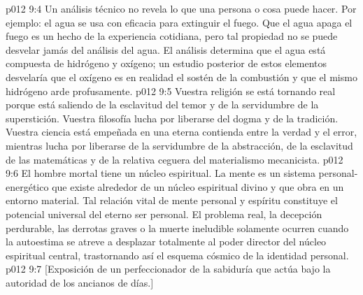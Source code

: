 \vs p012 9:4 Un análisis técnico no revela lo que una persona o cosa puede hacer. Por ejemplo: el agua se usa con eficacia para extinguir el fuego. Que el agua apaga el fuego es un hecho de la experiencia cotidiana, pero tal propiedad no se puede desvelar jamás del análisis del agua. El análisis determina que el agua está compuesta de hidrógeno y oxígeno; un estudio posterior de estos elementos desvelaría que el oxígeno es en realidad el sostén de la combustión y que el mismo hidrógeno arde profusamente.
\vs p012 9:5 Vuestra religión se está tornando real porque está saliendo de la esclavitud del temor y de la servidumbre de la superstición. Vuestra filosofía lucha por liberarse del dogma y de la tradición. Vuestra ciencia está empeñada en una eterna contienda entre la verdad y el error, mientras lucha por liberarse de la servidumbre de la abstracción, de la esclavitud de las matemáticas y de la relativa ceguera del materialismo mecanicista.
\vs p012 9:6 \pc El hombre mortal tiene un núcleo espiritual. La mente es un sistema personal\hyp{}energético que existe alrededor de un núcleo espiritual divino y que obra en un entorno material. Tal relación vital de mente personal y espíritu constituye el potencial universal del eterno ser personal. El problema real, la decepción perdurable, las derrotas graves o la muerte ineludible solamente ocurren cuando la autoestima se atreve a desplazar totalmente al poder director del núcleo espiritual central, trastornando así el esquema cósmico de la identidad personal.
\vsetoff
\vs p012 9:7 [Exposición de un perfeccionador de la sabiduría que actúa bajo la autoridad de los ancianos de días.]
